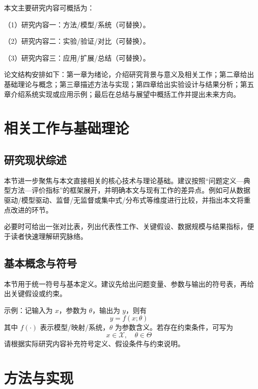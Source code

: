 \documentclass[unicode,master,submission,final]{scutthesis}
\begin{document}
本文主要研究内容可概括为：

（1）研究内容一：方法/模型/系统（可替换）。

（2）研究内容二：实验/验证/对比（可替换）。

（3）研究内容三：应用/扩展/总结（可替换）。

论文结构安排如下：第一章为绪论，介绍研究背景与意义及相关工作；第二章给出基础理论与概念；第三章描述方法与实现；第四章给出实验设计与结果分析；第五章介绍系统实现或应用示例；最后在总结与展望中概括工作并提出未来方向。

\chapter{相关工作与基础理论}

\section{研究现状综述}

本节进一步聚焦与本文直接相关的核心技术与理论基础。建议按照“问题定义—典型方法—评价指标”的框架展开，并明确本文与现有工作的差异点。例如可从数据驱动/模型驱动、监督/无监督或集中式/分布式等维度进行比较，并指出本文将重点改进的环节。

必要时可给出一张对比表，列出代表性工作、关键假设、数据规模与结果指标，便于读者快速理解研究脉络。

\section{基本概念与符号}

本节用于统一符号与基本定义。建议先给出问题变量、参数与输出的符号表，再给出关键假设或约束。

示例：记输入为 $x$，参数为 $\theta$，输出为 $y$，则有
\begin{equation}
    y = f(x; \theta)
\end{equation}
其中 $f(\cdot)$ 表示模型/映射/系统，$\theta$ 为参数含义。若存在约束条件，可写为
\begin{equation}
    x \in \mathcal X,\quad \theta \in \Theta
\end{equation}
请根据实际研究内容补充符号定义、假设条件与约束说明。

\chapter{方法与实现}
\end{document}
